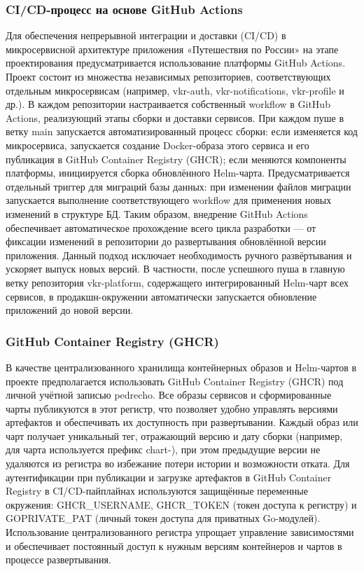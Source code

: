 \subsubsection*{CI/CD-процесс на основе GitHub Actions}
Для обеспечения непрерывной интеграции и доставки (CI/CD) в микросервисной архитектуре приложения «Путешествия по России» на этапе проектирования предусматривается использование платформы GitHub Actions. Проект состоит из множества независимых репозиториев, соответствующих отдельным микросервисам (например, vkr-auth, vkr-notifications, vkr-profile и др.). В каждом репозитории настраивается собственный workflow в GitHub Actions, реализующий этапы сборки и доставки сервисов. При каждом пуше в ветку main запускается автоматизированный процесс сборки: если изменяется код микросервиса, запускается создание Docker-образа этого сервиса и его публикация в GitHub Container Registry (GHCR); если меняются компоненты платформы, инициируется сборка обновлённого Helm-чарта. Предусматривается отдельный триггер для миграций базы данных: при изменении файлов миграции запускается выполнение соответствующего workflow для применения новых изменений в структуре БД.
Таким образом, внедрение GitHub Actions обеспечивает автоматическое прохождение всего цикла разработки — от фиксации изменений в репозитории до развертывания обновлённой версии приложения. Данный подход исключает необходимость ручного развёртывания и ускоряет выпуск новых версий. В частности, после успешного пуша в главную ветку репозитория vkr-platform, содержащего интегрированный Helm-чарт всех сервисов, в продакшн-окружении автоматически запускается обновление приложений до новой версии.

\subsubsection*{GitHub Container Registry (GHCR)}
В качестве централизованного хранилища контейнерных образов и Helm-чартов в проекте предполагается использовать GitHub Container Registry (GHCR) под личной учётной записью pedrecho. Все образы сервисов и сформированные чарты публикуются в этот регистр, что позволяет удобно управлять версиями артефактов и обеспечивать их доступность при развертывании.
Каждый образ или чарт получает уникальный тег, отражающий версию и дату сборки (например, для чарта используется префикс chart-), при этом предыдущие версии не удаляются из регистра во избежание потери истории и возможности отката. Для аутентификации при публикации и загрузке артефактов в GitHub Container Registry в CI/CD-пайплайнах используются защищённые переменные окружения: GHCR\_USERNAME, GHCR\_TOKEN (токен доступа к регистру) и GOPRIVATE\_PAT (личный токен доступа для приватных Go-модулей). Использование централизованного регистра упрощает управление зависимостями и обеспечивает постоянный доступ к нужным версиям контейнеров и чартов в процессе развертывания.


